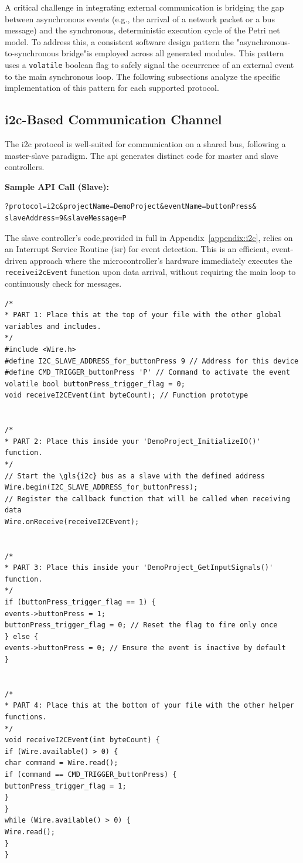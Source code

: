 A critical challenge in integrating external communication is bridging the gap between asynchronous events (e.g., the arrival of a network packet or a bus message) and the synchronous, deterministic execution cycle of the Petri net model. To address this, a consistent software design pattern the "asynchronous-to-synchronous bridge"is employed across all generated modules. This pattern uses a \texttt{volatile} boolean flag to safely signal the occurrence of an external event to the main synchronous loop. The following subsections analyze the specific implementation of this pattern for each supported protocol.

\subsection{\gls{i2c}-Based Communication Channel}
The \gls{i2c} protocol is well-suited for communication on a shared bus, following a master-slave paradigm. The \gls{api} generates distinct code for master and slave controllers.

\noindent\textbf{Sample API Call (Slave):}
\begin{verbatim}
?protocol=i2c&projectName=DemoProject&eventName=buttonPress&
slaveAddress=9&slaveMessage=P
\end{verbatim}

The slave controller's code,provided in full in Appendix~\ref{appendix:i2c}, relies on an Interrupt Service Routine (\gls{isr}) for event detection. This is an efficient, event-driven approach where the microcontroller's hardware immediately executes the \texttt{receive\gls{i2c}Event} function upon data arrival, without requiring the main loop to continuously check for messages.

\begin{verbatim}
/*
* PART 1: Place this at the top of your file with the other global 
variables and includes.
*/
#include <Wire.h>
#define I2C_SLAVE_ADDRESS_for_buttonPress 9 // Address for this device
#define CMD_TRIGGER_buttonPress 'P' // Command to activate the event
volatile bool buttonPress_trigger_flag = 0;
void receiveI2CEvent(int byteCount); // Function prototype


/*
* PART 2: Place this inside your 'DemoProject_InitializeIO()' function.
*/
// Start the \gls{i2c} bus as a slave with the defined address
Wire.begin(I2C_SLAVE_ADDRESS_for_buttonPress);
// Register the callback function that will be called when receiving data
Wire.onReceive(receiveI2CEvent);


/*
* PART 3: Place this inside your 'DemoProject_GetInputSignals()' function.
*/
if (buttonPress_trigger_flag == 1) {
events->buttonPress = 1;
buttonPress_trigger_flag = 0; // Reset the flag to fire only once
} else {
events->buttonPress = 0; // Ensure the event is inactive by default
}


/*
* PART 4: Place this at the bottom of your file with the other helper functions.
*/
void receiveI2CEvent(int byteCount) {
if (Wire.available() > 0) {
char command = Wire.read();
if (command == CMD_TRIGGER_buttonPress) {
buttonPress_trigger_flag = 1;
}
}
while (Wire.available() > 0) {
Wire.read();
}
}
\end{verbatim}

